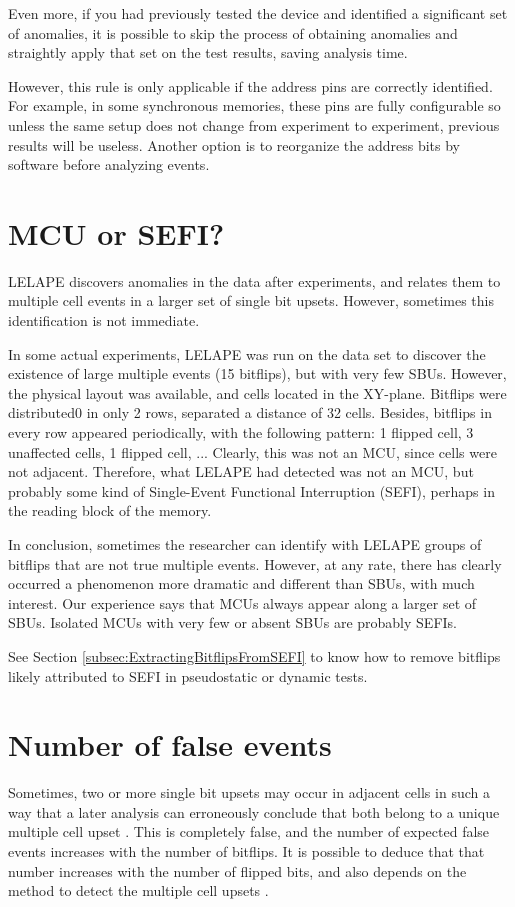 Even more, if you had previously tested the device and identified a significant set of anomalies, it is possible to skip the process of obtaining anomalies and straightly apply that set on the test results, saving analysis time.

However, this rule is only applicable if the address pins are correctly identified. For example, in some synchronous memories, these pins are fully configurable so unless the same setup does not change from experiment to experiment, previous results will be useless. Another option is to reorganize the address bits by software before analyzing events.
%
\section{MCU or SEFI?}
%
LELAPE discovers anomalies in the data after experiments, and relates them to multiple cell events in a larger set of single bit upsets. However, sometimes this identification is not immediate. 

In some actual experiments, LELAPE was run on the data set to discover the existence of large multiple events (15 bitflips), but with very few SBUs. However, the physical layout was available, and cells located in the XY-plane. Bitflips were distributed0 in only 2 rows, separated a distance of 32 cells. Besides, bitflips in every row appeared periodically, with the following pattern: 1 flipped cell, 3 unaffected cells, 1 flipped cell, ... Clearly, this was not an MCU, since cells were not adjacent. Therefore, what LELAPE had detected was not an MCU, but probably some kind of Single-Event Functional Interruption (SEFI), perhaps in the reading block of the memory.

In conclusion, sometimes the researcher can identify with LELAPE groups of bitflips that are not true multiple events. However, at any rate, there has clearly occurred a phenomenon more dramatic and different than SBUs, with much interest. Our experience says that MCUs always appear along a larger set of SBUs. Isolated MCUs with very few or absent SBUs are probably SEFIs.

See Section \ref{subsec:ExtractingBitflipsFromSEFI} to know how to remove bitflips likely attributed to SEFI in pseudostatic or dynamic tests.
%
\section{Number of false events}
%
Sometimes, two or more single bit upsets may occur in adjacent cells in such a way that a later analysis can erroneously conclude that both belong to a unique multiple cell upset \cite{Tausch2009}. This is completely false, and the number of expected false events increases with the number of bitflips. It is possible to deduce that that number increases with the number of flipped bits, and also depends on the method to detect the multiple cell upsets \cite{Franco2020}. 

